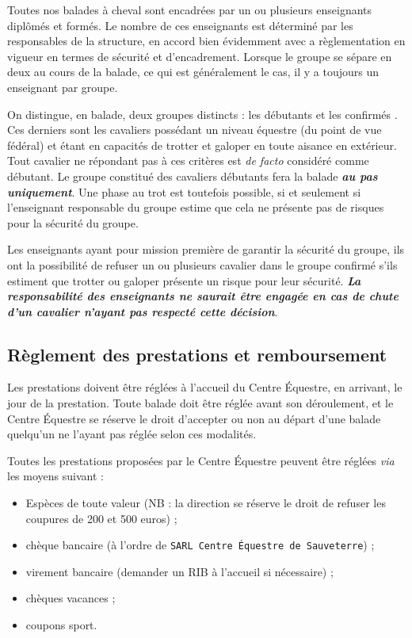 \documentclass[11pt,a4paper]{article}
\begin{document}
 Toutes nos balades à cheval sont encadrées par un ou plusieurs enseignants diplômés et formés. Le nombre de ces enseignants est déterminé par les responsables de la structure, en accord bien évidemment avec a règlementation en vigueur en termes de sécurité et d'encadrement. Lorsque le groupe se sépare en deux au cours de la balade, ce qui est généralement le cas, il y a toujours un enseignant par groupe.

On distingue, en balade, deux groupes distincts : les \og débutants \fg{} et les \og confirmés \fg{}. Ces derniers sont les cavaliers possédant un niveau équestre (du point de vue fédéral) et étant en capacités de trotter et galoper en toute aisance en extérieur. Tout cavalier ne répondant pas à ces critères est \textit{de facto} considéré comme débutant. Le groupe constitué des cavaliers débutants fera la balade \textit{\textbf{au pas uniquement}}. Une phase au trot est toutefois possible, si et seulement si l'enseignant responsable du groupe estime que cela ne présente pas de risques pour la sécurité du groupe.

Les enseignants ayant pour mission première de garantir la sécurité du groupe, ils ont la possibilité de refuser un ou plusieurs cavalier dans le groupe confirmé s'ils estiment que trotter ou galoper présente un risque pour leur sécurité. \textit{\textbf{La responsabilité des enseignants ne saurait être engagée en cas de chute d'un cavalier n'ayant pas respecté cette décision}}.

\subsection{Règlement des prestations et remboursement}

Les prestations doivent être réglées à l'accueil du Centre Équestre, en arrivant, le jour de la prestation. Toute balade doit être réglée avant son déroulement, et le Centre Équestre se réserve le droit d'accepter ou non au départ d'une balade quelqu'un ne l'ayant pas réglée selon ces modalités.

Toutes les prestations proposées par le Centre Équestre peuvent être réglées \textit{via} les moyens suivant :
\begin{itemize}
  \item
  Espèces de toute valeur (NB : la direction se réserve le droit de refuser les coupures de 200 et 500 euros) ;
  \item
  chèque bancaire (à l'ordre de \texttt{SARL Centre Équestre de Sauveterre}) ;
  \item
  virement bancaire (demander un RIB à l'accueil si nécessaire) ;
  \item
  chèques vacances ;
  \item
  coupons sport.
\end{itemize}
\end{document}
